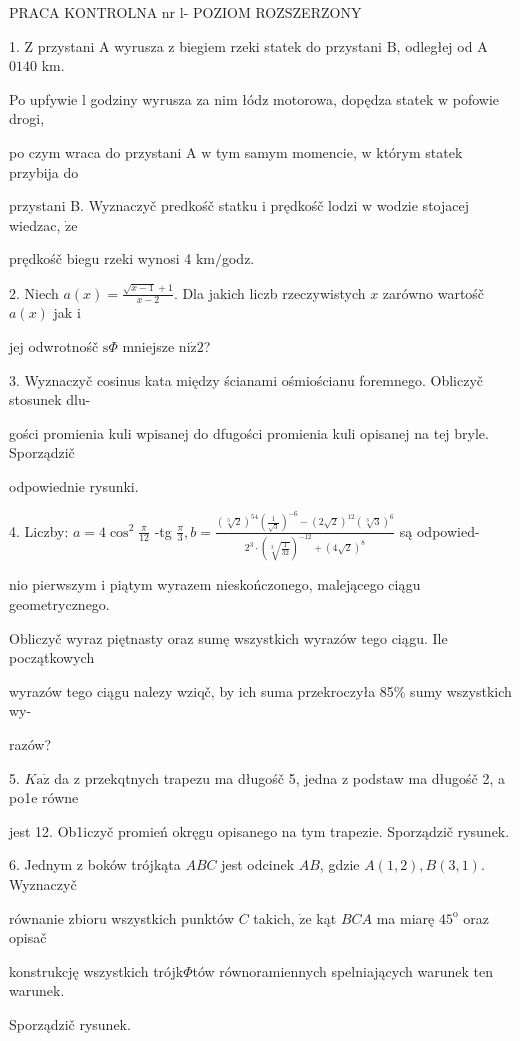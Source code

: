 \documentclass[a4paper,12pt]{article}
\begin{document}
PRACA KONTROLNA nr l- POZIOM ROZSZERZONY

1. $\mathrm{Z}$ przystani A wyrusza $\mathrm{z}$ biegiem rzeki statek do przystani $\mathrm{B}$, odległej od A $0140$ km.

Po upfywie l godziny wyrusza za nim łódz$\acute{}$ motorowa, dopędza statek $\mathrm{w}$ pofowie drogi,

po czym wraca do przystani A $\mathrm{w}$ tym samym momencie, $\mathrm{w}$ którym statek przybija do

przystani B. Wyznaczyč predkośč statku $\mathrm{i}$ prędkośč lodzi $\mathrm{w}$ wodzie stojacej wiedzac, $\dot{\mathrm{z}}\mathrm{e}$

prędkośč biegu rzeki wynosi 4 $\mathrm{k}\mathrm{m}/$godz.

2. Niech $a(x)=\displaystyle \frac{\sqrt{x-1}+1}{x-2}$. Dla jakich liczb rzeczywistych $x$ zarówno wartośč $a(x)$ jak $\mathrm{i}$

jej odwrotnośč $\mathrm{s}\Phi$ mniejsze $\mathrm{n}\mathrm{i}\dot{\mathrm{z}}2$?

3. Wyznaczyč cosinus kata między ścianami ośmiościanu foremnego. Obliczyč stosunek dlu-

gości promienia kuli wpisanej do dfugości promienia kuli opisanej na tej bryle. Sporządzič

odpowiednie rysunki.

4. Liczby: $a = 4\displaystyle \cos^{2}\frac{\pi}{12}$ -tg $\displaystyle \frac{\pi}{3}, b = \displaystyle \frac{(\sqrt[3]{2})^{54}(\frac{1}{\sqrt{3}})^{-6}-(2\sqrt{2})^{12}(\sqrt[3]{3})^{6}}{2^{3}\cdot(\sqrt[3]{\frac{1}{32}})^{-12}+(4\sqrt{2})^{8}}$ są odpowied-

nio pierwszym $\mathrm{i}$ piątym wyrazem nieskończonego, malejącego ciągu geometrycznego.

Obliczyč wyraz piętnasty oraz sumę wszystkich wyrazów tego ciągu. Ile początkowych

wyrazów tego ciągu nalezy wziqč, by ich suma przekroczyła 85\% sumy wszystkich wy-

razów?

5. $K\mathrm{a}\dot{\mathrm{z}}$ da $\mathrm{z}$ przekqtnych trapezu ma długośč 5, jedna $\mathrm{z}$ podstaw ma długośč 2, a po1e równe

jest 12. Ob1iczyč promień okręgu opisanego na tym trapezie. Sporządzič rysunek.

6. Jednym $\mathrm{z}$ boków trójkąta $ABC$ jest odcinek $AB$, gdzie $A(1,2), B(3,1)$. Wyznaczyč

równanie zbioru wszystkich punktów $C$ takich, $\dot{\mathrm{z}}\mathrm{e}$ kąt $BCA$ ma miarę $45^{\mathrm{o}}$ oraz opisač

konstrukcję wszystkich trójk$\Phi$tów równoramiennych spelniających warunek ten warunek.

Sporządzič rysunek.
\end{document}
